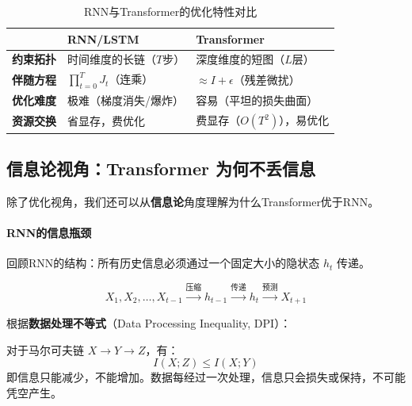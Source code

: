 \begin{table}[htbp]
\centering
\renewcommand{\arraystretch}{1.4}
\begin{tabularx}{\textwidth}{p{2.4cm}|X|X}
\toprule
& \textbf{RNN/LSTM} & \textbf{Transformer} \\
\midrule
\textbf{约束拓扑} & 时间维度的长链（$T$步） & 深度维度的短图（$L$层） \\
\midrule
\textbf{伴随方程} & $\prod_{t=0}^{T} J_t$（连乘） & $\approx I + \epsilon$（残差微扰） \\
\midrule
\textbf{优化难度} & 极难（梯度消失/爆炸） & 容易（平坦的损失曲面） \\
\midrule
\textbf{资源交换} & 省显存，费优化 & 费显存（$O(T^2)$），易优化 \\
\bottomrule
\end{tabularx}
\caption{RNN与Transformer的优化特性对比}
\end{table}

\subsection{信息论视角：Transformer 为何不丢信息}

除了优化视角，我们还可以从\textbf{信息论}角度理解为什么Transformer优于RNN。

\paragraph{RNN的信息瓶颈}

回顾RNN的结构：所有历史信息必须通过一个固定大小的隐状态 $h_t$ 传递。

\begin{equation}
    X_1, X_2, \ldots, X_{t-1} \xrightarrow{\text{压缩}} h_{t-1} \xrightarrow{\text{传递}} h_t \xrightarrow{\text{预测}} X_{t+1}
\end{equation}

根据\textbf{数据处理不等式}（Data Processing Inequality, DPI）：

\begin{keytheorem}[title=数据处理不等式]
对于马尔可夫链 $X \to Y \to Z$，有：
\begin{equation}
    I(X; Z) \leq I(X; Y)
\end{equation}
即信息只能减少，不能增加。数据每经过一次处理，信息只会损失或保持，不可能凭空产生。
\end{keytheorem}

